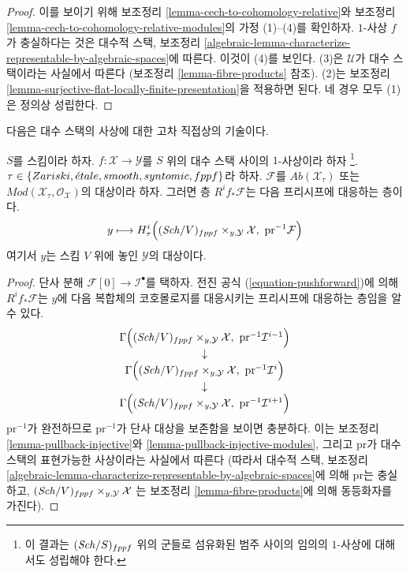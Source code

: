 \begin{proof}
이를 보이기 위해 보조정리 \ref{lemma-cech-to-cohomology-relative}와
보조정리 \ref{lemma-cech-to-cohomology-relative-modules}의
가정 (1)--(4)를 확인하자.
$1$-사상 $f$가 충실하다는 것은 대수적 스택, 보조정리
\ref{algebraic-lemma-characterize-representable-by-algebraic-spaces}에
따른다. 이것이 (4)를 보인다.
(3)은 $\mathcal{U}$가 대수 스택이라는 사실에서 따른다
(보조정리 \ref{lemma-fibre-products} 참조).
(2)는 보조정리 \ref{lemma-surjective-flat-locally-finite-presentation}을
적용하면 된다. 네 경우 모두 (1)은 정의상 성립한다.
\end{proof}

\noindent
다음은 대수 스택의 사상에 대한 고차 직접상의 기술이다.

\begin{lemma}
\label{lemma-pushforward-restriction}
$S$를 스킴이라 하자. $f : \mathcal{X} \to \mathcal{Y}$를
$S$ 위의 대수 스택 사이의 $1$-사상이라 하자
\footnote{이 결과는 $(\mathit{Sch}/S)_{fppf}$ 위의 군들로 섬유화된
범주 사이의 임의의 $1$-사상에 대해서도 성립해야 한다.}.
$\tau \in \{Zariski,\linebreak[0] \etale,\linebreak[0]
smooth,\linebreak[0] syntomic,\linebreak[0] fppf\}$라 하자.
$\mathcal{F}$를 $\textit{Ab}(\mathcal{X}_\tau)$ 또는
$\textit{Mod}(\mathcal{X}_\tau, \mathcal{O}_\mathcal{X})$의
대상이라 하자. 그러면 층 $R^if_*\mathcal{F}$는 다음 프리시프에
대응하는 층이다.
$$
y \longmapsto
H^i_\tau\Big((\mathit{Sch}/V)_{fppf} \times_{y, \mathcal{Y}} \mathcal{X},
\ \text{pr}^{-1}\mathcal{F}\Big)
$$
여기서 $y$는 스킴 $V$ 위에 놓인 $\mathcal{Y}$의 대상이다.
\end{lemma}

\begin{proof}
단사 분해 $\mathcal{F}[0] \to \mathcal{I}^\bullet$를 택하자.
전진 공식 (\ref{equation-pushforward})에 의해
$R^if_*\mathcal{F}$는 $y$에 다음 복합체의 코호몰로지를
대응시키는 프리시프에 대응하는 층임을 알 수 있다.
$$
\begin{matrix}
\Gamma\Big((\mathit{Sch}/V)_{fppf} \times_{y, \mathcal{Y}} \mathcal{X},
\ \text{pr}^{-1}\mathcal{I}^{i - 1}\Big) \\
\downarrow \\
\Gamma\Big((\mathit{Sch}/V)_{fppf} \times_{y, \mathcal{Y}} \mathcal{X},
\ \text{pr}^{-1}\mathcal{I}^i\Big) \\
\downarrow \\
\Gamma\Big((\mathit{Sch}/V)_{fppf} \times_{y, \mathcal{Y}} \mathcal{X},
\ \text{pr}^{-1}\mathcal{I}^{i + 1}\Big)
\end{matrix}
$$
$\text{pr}^{-1}$가 완전하므로 $\text{pr}^{-1}$가 단사 대상을
보존함을 보이면 충분하다. 이는 보조정리 \ref{lemma-pullback-injective}와
\ref{lemma-pullback-injective-modules}, 그리고 $\text{pr}$가
대수 스택의 표현가능한 사상이라는 사실에서 따른다
(따라서 대수적 스택, 보조정리
\ref{algebraic-lemma-characterize-representable-by-algebraic-spaces}에
의해 $\text{pr}$는 충실하고,
$(\mathit{Sch}/V)_{fppf} \times_{y, \mathcal{Y}} \mathcal{X}$
는 보조정리 \ref{lemma-fibre-products}에 의해 동등화자를 가진다).
\end{proof}

